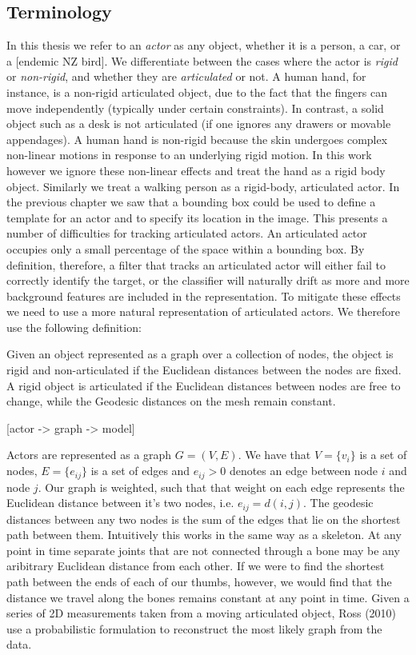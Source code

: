 \subsection{Terminology}

In this thesis we refer to an \textit{actor} as any object, whether it is a person, a car, or a [endemic NZ bird]. We differentiate between the cases where the actor is \textit{rigid} or \textit{non-rigid}, and whether they are \textit{articulated} or not. A human hand, for instance, is a non-rigid articulated object, due to the fact that the fingers can move independently (typically under certain constraints). In contrast, a solid object such as a desk is not articulated (if one ignores any drawers or movable appendages). A human hand is non-rigid because the skin undergoes complex non-linear motions in response to an underlying rigid motion. In this work however we ignore these non-linear effects and treat the hand as a rigid body object. Similarly we treat a walking person as a rigid-body, articulated actor. In the previous chapter we saw that a bounding box could be used to define a template for an actor and to specify its location in the image. This presents a number of difficulties for tracking articulated actors. An articulated actor occupies only a small percentage of the space within a bounding box. By definition, therefore, a filter that tracks an articulated actor will either fail to correctly identify the target, or the classifier will naturally drift as more and more background features are included in the representation. To mitigate these effects we need to use a more natural representation of articulated actors. We therefore use the following definition:

\theoremstyle{definition}
\begin{definition}
\label{articulatedActor}
Given an object represented as a graph over a collection of nodes, the object is rigid and non-articulated if the Euclidean distances between the nodes are fixed. A rigid object is articulated if the Euclidean distances between nodes are free to change, while the Geodesic distances on the mesh remain constant. 
\end{definition}

[actor -> graph -> model]

Actors are represented as a graph $G = (V, E)$. We have that $V = \{v_i\}$ is a set of nodes, $E = \{e_{ij}\}$ is a set of edges and $e_{ij} > 0$ denotes an edge between node $i$ and node $j$. Our graph is weighted, such that that weight on each edge represents the Euclidean distance between it's two nodes, i.e. $e_{ij} = d(i,j)$. The geodesic distances between any two nodes is the sum of the edges that lie on the shortest path between them. Intuitively this works in the same way as a skeleton. At any point in time separate joints that are not connected through a bone may be any aribitrary Euclidean distance from each other. If we were to find the shortest path between the ends of each of our thumbs, however, we would find that the distance we travel along the bones remains constant at any point in time. Given a series of 2D measurements taken from a moving articulated object, Ross (2010) use a probabilistic formulation to reconstruct the most likely graph from the data.

